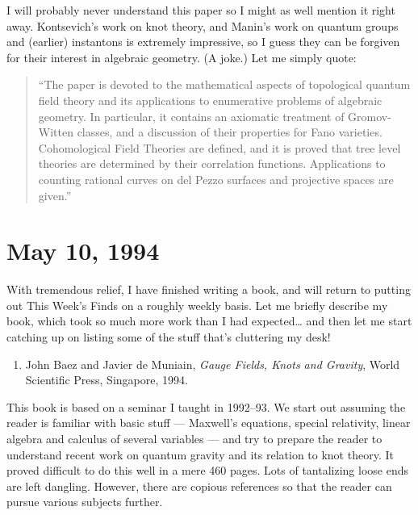 \documentclass{article}
\def\tightlist{}
\begin{document}
I will probably never understand this paper so I might as well mention
it right away. Kontsevich's work on knot theory, and Manin's work on
quantum groups and (earlier) instantons is extremely impressive, so I
guess they can be forgiven for their interest in algebraic geometry. (A
joke.) Let me simply quote:

\begin{quote}
``The paper is devoted to the mathematical aspects of topological
quantum field theory and its applications to enumerative problems of
algebraic geometry. In particular, it contains an axiomatic treatment of
Gromov-Witten classes, and a discussion of their properties for Fano
varieties. Cohomological Field Theories are defined, and it is proved
that tree level theories are determined by their correlation functions.
Applications to counting rational curves on del Pezzo surfaces and
projective spaces are given.''
\end{quote}



\hypertarget{week33}{%
\section{May 10, 1994}\label{week33}}

With tremendous relief, I have finished writing a book, and will return
to putting out This Week's Finds on a roughly weekly basis. Let me
briefly describe my book, which took so much more work than I had
expected\ldots{} and then let me start catching up on listing some of
the stuff that's cluttering my desk!

\begin{enumerate}
\def\labelenumi{\arabic{enumi})}
\tightlist
\item
  John Baez and Javier de
  Muniain, \emph{Gauge Fields, Knots and Gravity}, World Scientific Press, Singapore, 
  1994.
\end{enumerate}

This book is based on a seminar I taught in 1992--93. We start out
assuming the reader is familiar with basic stuff --- Maxwell's
equations, special relativity, linear algebra and calculus of several
variables --- and try to prepare the reader to understand recent work on
quantum gravity and its relation to knot theory. It proved difficult to
do this well in a mere 460 pages. Lots of tantalizing loose ends are
left dangling. However, there are copious references so that the reader
can pursue various subjects further.
\end{document}
